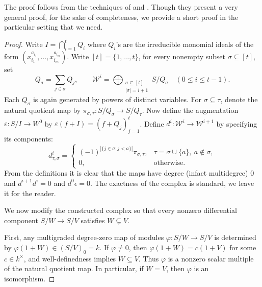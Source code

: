 \documentclass[11pt,letterpaper]{amsart}
\newcommand{\x}{\xrightarrow{}}
\theoremstyle{plain}
\theoremstyle{definition}
\theoremstyle{remark}
\begin{document}
The proof follows from the techniques of \cite{miller2002cohen} and \cite[Proposition~2.1 and Theorem~2.2]{yanagawa2008notes}. Though they present a very general proof, for the sake of completeness, we provide a short proof in the particular setting that we need. 
\begin{proof}
    Write $I=\bigcap_{i=1}^t Q_i$ where $Q_i$'s are the irreducible monomial ideals of the form $(x_{i_1}^{a_{i_1}},...,x_{i_m}^{a_{i_m}})$. Write $[t]=\{1,\ldots,t\}$, for every nonempty subset
$\sigma\subseteq[t]$, set
\[
Q_\sigma=\sum_{j\in\sigma}Q_j,
\qquad
\mathcal{W}^i=\bigoplus_{\substack{\sigma\subseteq[t]\\|\sigma|=i+1}}
S/Q_\sigma
\quad(0\leq i\leq t-1).
\]
Each $Q_\sigma$ is again generated by powers of distinct variables.
For $\sigma\subseteq\tau$, denote the natural quotient map by $
\pi_{\sigma,\tau}:S/Q_\sigma\longrightarrow S/Q_\tau$. Now define the augmentation
$\varepsilon:S/I\x W^0$ by
$\varepsilon(f+I)=(f+Q_j)_{j=1}^t$.
Define $d^i:\mathcal{W}^i\to \mathcal{W}^{i+1}$ by specifying its components:
\[
d^i_{\tau,\sigma}=
\begin{cases}
(-1)^{|\{j\in\sigma:j<a\}|}\pi_{\sigma,\tau},
  &\tau=\sigma\cup\{a\},\ a\notin\sigma,\\
0,&\text{otherwise}.
\end{cases}
\]
From the definitions it is clear that the maps have degree (infact multidegree) 0 and $d^{i+1}d^{i}=0$ and $d^0\epsilon=0$. The exactness of the complex is standard, we leave it for the reader. 

We now modify the constructed complex so that every nonzero differential component $S/W\to S/V$ satisfies $W\subsetneq V$.

First, any multigraded degree-zero map of modules $\varphi:S/W\to S/V$
is determined by $\varphi(1+W)\in(S/V)_0=k$.
If $\varphi\ne0$, then $\varphi(1+W)=c(1+V)$ for some
$c\in k^\times$, and well-definedness implies $W\subseteq V$.
Thus $\varphi$ is a nonzero scalar multiple of the natural
quotient map. In particular, if $W=V$, then $\varphi$ is
an isomorphism.


\end{proof}
\end{document}
